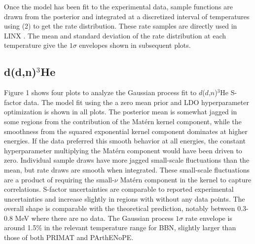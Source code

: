 \documentclass[%
 reprint,
superscriptaddress,
nofootinbib,
 amsmath,amssymb,
 aps,
 pra,
]{revtex4-2}
\begin{document}
Once the model has been fit to the experimental data, sample functions are drawn from the posterior and integrated at a discretized interval of temperatures using (2) to get the rate distribution. These rate samples are directly used in LINX \cite{Giovanetti2024}. The mean and standard deviation of the rate distribution at each temperature give the $1\sigma$ envelopes shown in subsequent plots.

\subsection{d(d,n)$^3$He}

Figure 1 shows four plots to analyze the Gaussian process fit to $d$($d$,$n$)$^3$He S-factor data. The model fit using the a zero mean prior and LDO hyperparameter optimization is shown in all plots. The posterior mean is somewhat jagged in some regions from the contribution of the Mat\'ern kernel component, while the smoothness from the squared exponential kernel component dominates at higher energies. If the data preferred this smooth behavior at all energies, the constant hyperparameter multiplying the Mat\'ern component would have been driven to zero. Individual sample draws have more jagged small-scale fluctuations than the mean, but rate draws are smooth when integrated. These small-scale fluctuations are a product of requiring the small-$\nu$ Mat\'ern component in the kernel to capture correlations. S-factor uncertainties are comparable to reported experimental uncertainties and increase slightly in regions with without any data points. The overall shape is comparable with the theoretical prediction, notably between 0.3-0.8 MeV where there are no data. The Gaussian process $1\sigma$ rate envelope is around 1.5\% in the relevant temperature range for BBN, slightly larger than those of both PRIMAT and PArthENoPE. 
\end{document}
